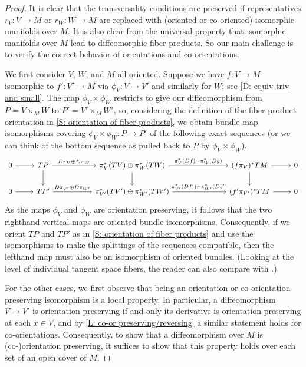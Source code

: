 \begin{proof}
	It is clear that the transversality conditions are preserved if representatives $r_V \colon V \to M$ or $r_W \colon W \to M$ are replaced with (oriented or co-oriented) isomorphic manifolds over $M$.
	It is also clear from the universal property that isomorphic manifolds over $M$ lead to diffeomorphic fiber products.
	So our main challenge is to verify the correct behavior of orientations and co-orientations.

	We first consider $V$, $W$, and $M$ all oriented.
	Suppose we have $f \colon V \to M$ isomorphic to $f' \colon V' \to M$ via $\phi_V \colon V \to V'$ and similarly for $W$; see \cref{D: equiv triv and small}.
	The map $\phi_V \times \phi_W$ restricts to give our diffeomorphism from $P = V \times_M W$ to $P' = V' \times_M W'$, so, considering the definition of the fiber product orientation in \cref{S: orientation of fiber products}, we obtain bundle map isomorphisms covering $\phi_V \times \phi_W \colon P \to P'$ of the following exact sequences (or we can think of the bottom sequence as pulled back to $P$ by $\phi_V \times \phi_W$).
	\begin{equation}
	\begin{tikzcd}
		0 \arrow[r] & TP \arrow[r,"D\pi_V \oplus D\pi_W"] \arrow[d] &[1cm] \pi_V^*(TV) \oplus \pi_W^*(TW) \arrow[r,"\pi_V^*(Df)-\pi_W^*(Dg)"] \arrow[d] &[1.7cm] (f\pi_V)^*TM \arrow[r] \arrow[d] & 0 \\
		0 \arrow[r] & TP' \arrow[r,"D\pi_{V'} \oplus D\pi_{W'}"] & \pi_{V'}^*(TV') \oplus \pi_{W'}^*(TW') \arrow[r,"\pi_{V'}^*(Df')-\pi_{W'}^*(Dg')"] & (f'\pi_{V'})^*TM \arrow[r] & 0
	\end{tikzcd}
	\end{equation}
	As the maps $\phi_V$ and $\phi_W$ are orientation preserving, it follows that the two righthand vertical maps are oriented bundle isomorphisms.
	Consequently, if we orient $TP$ and $TP'$ as in \cref{S: orientation of fiber products} and use the isomorphisms to make the splittings of the sequences compatible, then the lefthand map must also be an isomorphism of oriented bundles.
	(Looking at the level of individual tangent space fibers, the reader can also compare with \cite[Sections 9.1.1 and 9.3.1]{RamBas09}.)

	For the other cases, we first observe that being an orientation or co-orientation preserving isomorphism is a local property.
	In particular, a diffeomorphism $V \to V'$ is orientation preserving if and only its derivative is orientation preserving at each $x \in V$, and by \cref{L: co-or preserving/reversing} a similar statement holds for co-orientations.
	Consequently, to show that a diffeomorphism over $M$ is (co-)orientation preserving, it suffices to show that this property holds over each set of an open cover of $M$.


\end{proof}
